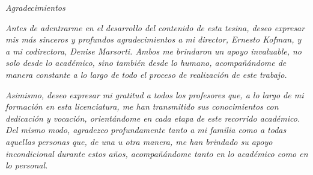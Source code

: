 \begin{center}

\textit{{\Large Agradecimientos}}

\textit{Antes de adentrarme en el desarrollo del contenido de esta tesina, deseo expresar mis más sinceros y profundos agradecimientos a mi director, Ernesto Kofman, y a mi codirectora, Denise Marsorti. Ambos me brindaron un apoyo invaluable, no solo desde lo académico, sino también desde lo humano, acompañándome de manera constante a lo largo de todo el proceso de realización de este trabajo.}

\textit{Asimismo, deseo expresar mi gratitud a todos los profesores que, a lo largo de mi formación en esta licenciatura, me han transmitido sus conocimientos con dedicación y vocación, orientándome en cada etapa de este recorrido académico. Del mismo modo, agradezco profundamente tanto a mi familia como a todas aquellas personas que, de una u otra manera, me han brindado su apoyo incondicional durante estos años, acompañándome tanto en lo académico como en lo personal.}
\end{center}